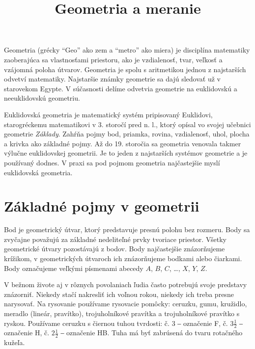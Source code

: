 \documentclass{article}
\title{Geometria a meranie}
\begin{document}
\maketitle

Geometria (grécky \enquote{Geo} ako zem a \enquote{metro} ako miera) je disciplína matematiky zaoberajúca sa vlastnosťami priestoru, ako je vzdialenosť, tvar, veľkosť a vzájomná poloha útvarov. Geometria je spolu s aritmetikou jednou z najstarších odvetví matematiky. Najstaršie známky geometrie sa dajú sledovať už v starovekom Egypte. V súčasnosti delíme odvetvia geometrie na euklidovskú a neeuklidovskú geometriu.

Euklidovská geometria je matematický systém pripisovaný Euklidovi, starogréckemu matematikovi v 3. storočí pred n. l., ktorý opísal vo svojej učebnici geometrie \emph{Základy}. Zahŕňa pojmy bod, priamka, rovina, vzdialenosť, uhol, plocha a krivka ako základné pojmy. Až do 19. storočia sa geometria venovala takmer výlučne euklidovskej geometrii. Je to jeden z najstarších systémov geometrie a je používaný dodnes. V praxi sa pod pojmom geometria najčastejšie myslí euklidovská geometria.

\section{Základné pojmy v geometrii}

Bod je geometrický útvar, ktorý predstavuje presnú polohu bez rozmeru. Body sa zvyčajne považujú za základné nedeliteľné prvky tvoriace priestor. Všetky geometrické útvary pozostávajú z bodov. Body najčastejšie znázorňujeme krížikom, v geometrických útvaroch ich znázorňujeme bodkami alebo čiarkami. Body označujeme veľkými písmenami abecedy \(A\), \(B\), \(C\), \dots, \(X\), \(Y\), \(Z\).

\vspace{5em}
\vspace{5em}

V bežnom živote aj v rôznych povolaniach ľudia často potrebujú svoje predstavy znázorniť. Niekedy stačí nakresliť ich voľnou rokou, niekedy ich treba presne narysovať. Na rysovanie používame rysovacie pomôcky: ceruzku, gumu, kružidlo, meradlo (lineár, pravítko), trojuholníkové pravítka a trojuholníkové pravítko s ryskou. Používame ceruzku s čiernou tuhou tvrdosti: č. \(3\) ‒ označenie F, č. \(3 \frac{1}{2}\) ‒ označenie H, č. \(2 \frac{1}{2}\) ‒ označenie HB. Tuha má byť zabrúsená do tvaru rotačného kužeľa.
\end{document}
